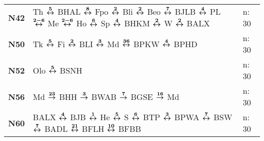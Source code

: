 \begin{minipage}[t]{0.45\textwidth}
\begin{tabular}{>{\bfseries}L{1.2cm}L{9.0cm}L{3.0cm}}
\nbus{} N42   & Th $\xarwe{5}$ BHAL $\xarwe{8}$ Fpo $\xarwe{2}$ Bli $\xarwe{2}$ Beo $\xarwe{7}$ BJLB $\xarwe{4}$ PL $\xarwe{2-6}$ Me $\xarwe{2-6}$ Ho $\xarwe{6}$ Sp $\xarwe{4}$    %
                BHKM $\xarwe{2}$ W $\xarwe{2}$ BALX                                                                                                                                 & n: 30                      \\
\nbus{} N50   & Tk $\xarwe{5}$ Fi $\xarwe{2}$ BLI $\xarwe{3}$ Md $\xarwe{36}$ BPKW $\xarwe{4}$ BPHD                                                                                 & n: 30                      \\
\nbus{} N52   & Olo $\xarwe{5}$ BSNH                                                                                                                                                & n: 30                      \\
\nbus{} N56   & Md $\xarre{23}$ BHH $\xarre{3}$ BWAB $\xarre{7}$ BGSE $\xarre{16}$ Md                                                                                               & n: 30                      \\
\nbus{} N60   & BALX $\xarwe{4}$ BJB $\xarwe{1}$ He $\xarwe{5}$ S $\xarwe{6}$ BTP $\xarwe{3}$ BPWA $\xarwe{7}$ BSW $\xarwe{7}$ BADL 
$\xarwe{21}$ BFLH $\xarwe{10}$ BFBB                                                                               & n: 30 \\
\hline
\end{tabular}
\end{minipage}
\begin{minipage}[t]{0.05\textwidth}
\phantom{Tor}
\end{minipage}

